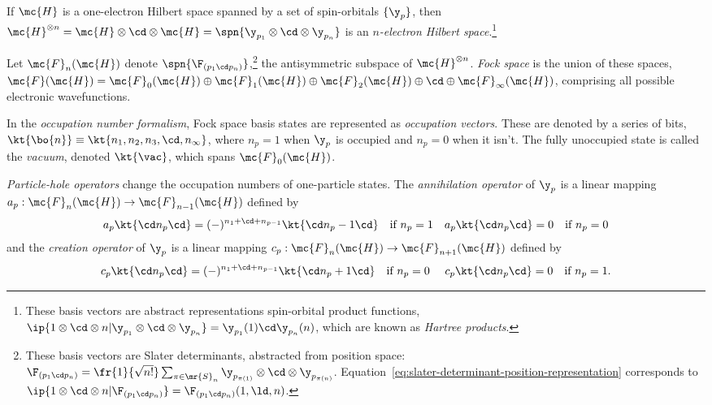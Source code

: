 \begin{dfn}
If $\mc{H}$ is a one-electron Hilbert space spanned by a set of spin-orbitals $\{\y_p\}$, then $\mc{H}^{\otimes n}=\mc{H}\otimes\cd\otimes\mc{H}=\spn\{\y_{p_1}{}\otimes\cd\otimes\y_{p_n}\}$ is an \textit{$n$-electron Hilbert space}.\footnote{These basis vectors are abstract representations spin-orbital product functions, $\ip{1\otimes\cd\otimes n|\y_{p_1}\otimes\cd\otimes\y_{p_n}}=\y_{p_1}(1)\cd\y_{p_n}(n)$, which are known as \textit{Hartree products}.}
\end{dfn}


\begin{dfn}\label{dfn:fock-space}
Let $\mc{F}_n(\mc{H})$ denote $\spn\{\F_{(p_1\cd p_n)}\}$,\footnote{%
These basis vectors are Slater determinants, abstracted from position space:
$
  \F_{(p_1\cd p_n)}
=
  \fr{1}{\sqrt{n!}}
  \sum_{\pi\in\mr{S}_n}
  \y_{p_{\pi(1)}}\otimes\cd\otimes
  \y_{p_{\pi(n)}}
$.
Equation~\ref{eq:slater-determinant-position-representation} corresponds to
$
  \ip{1\otimes\cd\otimes n|\F_{(p_1\cd p_n)}}= \F_{(p_1\cd p_n)}(1,\ld,n)
$.
}
the antisymmetric subspace of $\mc{H}^{\otimes n}$.
\textit{Fock space} is the union of these spaces, $\mc{F}(\mc{H})=\mc{F}_0(\mc{H})\oplus \mc{F}_1(\mc{H})\oplus \mc{F}_2(\mc{H})\oplus\cd\oplus \mc{F}_{\infty}(\mc{H})$, comprising all possible electronic wavefunctions.
\end{dfn}

\begin{dfn}\label{occupation-number-representation}
In the \textit{occupation number formalism}, Fock space basis states are represented as \textit{occupation vectors}.
These are denoted by a series of bits,
$
  \kt{\bo{n}}
\equiv
  \kt{n_1,n_2,n_3,\cd,n_\infty}
$,
where $n_p=1$ when $\y_p$ is occupied and $n_p=0$ when it isn't.
The fully unoccupied state is called the \textit{vacuum}, denoted $\kt{\vac}$, which spans $\mc{F}_0(\mc{H})$.
\end{dfn}

\begin{dfn}\label{dfn:particle-hole-operators}
\textit{Particle-hole operators} change the occupation numbers of one-particle states.
The \textit{annihilation operator} of $\y_p$ is a linear mapping $a_p:\mc{F}_n(\mc{H})\rightarrow \mc{F}_{n-1}(\mc{H})$ defined by
\begin{align}\label{eq:occ-num-annihilation-operator-action}
  a_p\kt{\cd n_p\cd}
=
  (-)^{n_1+\cd+n_{p-1}}
  \kt{\cd n_p-1\cd}
\ \ \ \text{if $n_p=1$}
&&
  a_p\kt{\cd n_p\cd}
=
  0
\ \ \ \text{if $n_p=0$}
\end{align}
and the \textit{creation operator} of $\y_p$ is a linear mapping $c_p:\mc{F}_n(\mc{H})\rightarrow \mc{F}_{n+1}(\mc{H})$ defined by
\begin{align}\label{eq:occ-num-creation-operator-action}
  c_p\kt{\cd n_p\cd}
=
  (-)^{n_1+\cd+n_{p-1}}
  \kt{\cd n_p+1\cd}
\ \ \ \text{if $n_p=0$\ }
&&
  c_p\kt{\cd n_p\cd}
=
  0
\ \ \ \text{if $n_p=1$.}
\end{align}
\end{dfn}

